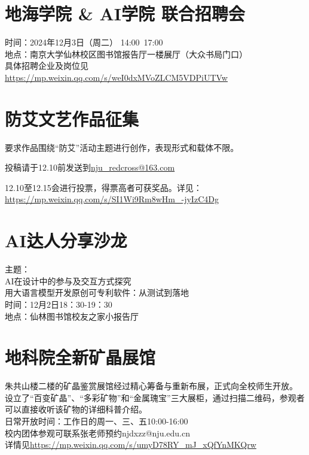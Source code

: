 \documentclass[letterpaper, 12pt]{article}
\begin{document}
\begin{multicols}{2}
\section{地海学院 \& AI学院 联合招聘会}
时间：2024年12月3日（周二） 14:00~17:00\\
地点：南京大学仙林校区图书馆报告厅一楼展厅（大众书局门口）\\
具体招聘企业及岗位见\url{https://mp.weixin.qq.com/s/weI0dxMVoZLCM5VDPiUTVw}\\
\section{防艾文艺作品征集}
要求作品围绕“防艾”活动主题进行创作，表现形式和载体不限。

投稿请于12.10前发送到\href{mailto:nju_redcross@163.com}{nju\_redcross@163.com}

12.10至12.15会进行投票，得票高者可获奖品。详见：\url{https://mp.weixin.qq.com/s/SI1Wi9Rm8wHm_-jyIzC4Dg}
\section{AI达人分享沙龙}
主题：\\
AI在设计中的参与及交互方式探究\\
用大语言模型开发原创可专利软件：从测试到落地\\
时间：12月2日18：30-19：30\\
地点：仙林图书馆校友之家小报告厅\\

\section{地科院全新矿晶展馆}
朱共山楼二楼的矿晶鉴赏展馆经过精心筹备与重新布展，正式向全校师生开放。\\
设立了“百变矿晶”、“多彩矿物”和“金属瑰宝”三大展柜，通过扫描二维码，参观者可以直接收听该矿物的详细科普介绍。\\
日常开放时间：工作日的周一、三、五10:00-16:00\\
校内团体参观可联系张老师预约njdxzz@nju.edu.cn\\
详情见\url{https://mp.weixin.qq.com/s/umyD78RY_mJ_xQfYnMKQrw}


\end{multicols}
\end{document}
